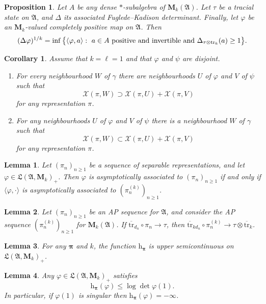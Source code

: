 \documentclass[10pt,a4paper]{amsart}
\newtheorem{lem}{Lemma}
\newtheorem{prop}{Proposition}
\newtheorem{cor}{Corollary}
\newcommand{\A}{\mathfrak{A}}
\newcommand{\Tr}{\mathrm{tr}}
\newcommand{\X}{\mathcal{X}}
\newcommand{\bspi}{\boldsymbol{\pi}}
\newcommand{\frL}{\mathfrak{L}}
\newcommand{\g}{\gamma}
\renewcommand{\phi}{\varphi}
\newcommand{\rmM}{\mathbf{M}}
\newcommand{\rmh}{\mathrm{h}}
\newcommand{\tr}{\overline{\mathrm{tr}}}
\begin{document}
\begin{prop}\label{prop:det-var-princ}
Let $A$ be any dense $\ast$-subalgebra of $\rmM_k(\A)$. Let $\tau$ be a tracial state on $\A$, and $\Delta$ its associated Fuglede--Kadison determinant.  Finally, let $\phi$ be an $\rmM_k$-valued completely positive map on $\A$.  Then
\begin{equation}\label{eq:det-var-princ}
(\Delta \phi)^{1/k} = \inf\big\{\langle \phi,a\rangle:\ a \in A\ \hbox{positive and invertible and}\ \Delta_{\tau\otimes \Tr_k}(a) \ge 1\big\}.
\end{equation}
\end{prop}

\begin{cor}\label{cor:sums}
Assume that $k=\ell=1$ and that $\phi$ and $\psi$ are disjoint.
\begin{enumerate}
\item[a.] For every neighbourhood $W$ of $\g$ there are neighbourhoods $U$ of $\phi$ and $V$ of $\psi$ such that
\[\X(\pi,W)\supset \X(\pi,U) + \X(\pi,V)\]
for any representation $\pi$.
\item[b.] For any neighbourhoods $U$ of $\phi$ and $V$ of $\psi$ there is a neighbourhood $W$ of $\g$ such that
\[\X(\pi,W) \subset \X(\pi,U) + \X(\pi,V)\]
for any representation $\pi$.
\end{enumerate}
\end{cor}

\begin{lem}\label{lem:strong-quot-for-pairing}
Let $(\pi_n)_{n\ge 1}$ be a sequence of separable representations, and let $\phi \in \frL(\A,\rmM_k)_+$.  Then $\phi$ is asymptotically associated to $(\pi_n)_{n\ge 1}$ if and only if $\langle \phi,\cdot\rangle$ is asymptotically associated to $(\pi_n^{(k)})_{n\ge 1}$. 
\end{lem}

\begin{lem}\label{lem:trace-conv-for-pairing}
Let $(\pi_n)_{n\ge 1}$ be an AP sequence for $\A$, and consider the AP sequence $(\pi^{(k)}_n)_{n\ge 1}$ for $\rmM_k(\A)$.  If $\tr_{d_n}\circ \pi_n\to \tau$, then $\tr_{kd_n}\circ \pi_n^{(k)}\to \tau \otimes \tr_k$.
\end{lem}

\begin{lem}\label{lem:upper-semicontinuity}
For any $\bspi$ and $k$, the function $\rmh_{\bspi}$ is upper semicontinuous on $\frL(\A,\rmM_k)_+$.
\end{lem}

\begin{lem}\label{lem:e-upper-bd}
Any $\phi \in \frL(\A,\rmM_k)_+$ satisfies
	\[\rmh_{\bspi}(\phi) \le \log \det \phi(1).\]
	In particular, if $\phi(1)$ is singular then $\rmh_{\bspi}(\phi) = -\infty$.
	\end{lem}
\end{document}
